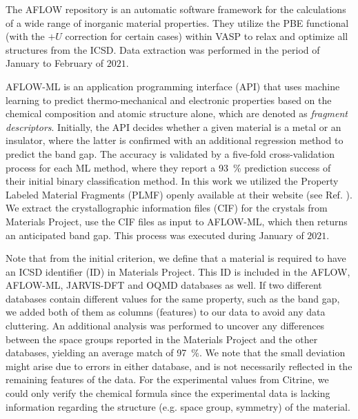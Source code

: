 \documentclass[superscriptaddress,
preprint,
 amsmath,amssymb,
 aps,
]{revtex4-2}
\begin{document}
The AFLOW \cite{Curtarolo2012, Curtarolo2012a, Calderon2015} repository is an automatic software framework for the calculations of a wide range of inorganic material properties. They utilize the PBE functional (with the $+U$ correction for certain cases) within VASP to relax and optimize all structures from the ICSD. Data extraction was performed in the period of January to February of $2021$.

AFLOW-ML \cite{Isayev2017} is an application programming interface (API) that uses machine learning to predict thermo-mechanical and electronic properties based on the chemical composition and atomic structure alone, which are denoted as \textit{fragment descriptors}. Initially, the API decides whether a given material is a metal or an insulator, where the latter is confirmed with an additional regression method to predict the band gap. The accuracy is validated by a five-fold cross-validation process for each ML method, where they report a \SI{93}{\percent} prediction success of their initial binary classification method. In this work we utilized the Property Labeled Material Fragments (PLMF) openly available at their website 
(see Ref. \cite{Isayev2017}). 
We extract the crystallographic information files (CIF) for the crystals from Materials Project, use the CIF files as input to AFLOW-ML, which then returns an anticipated band gap. This process was executed during January of $2021$. 

Note that from the initial criterion, we define that a material is required to have an ICSD identifier (ID) in Materials Project. This ID is included in the AFLOW,  AFLOW-ML, JARVIS-DFT and OQMD databases as well. If two different databases contain different values for the same property, such as the band gap, we added both of them as columns (features) to our data to avoid any data cluttering. An additional analysis was performed to uncover any differences between the space groups reported in the Materials Project and the other databases, yielding an average match of \SI{97}{\percent}. We note that the small deviation might arise due to errors in either database, and is not necessarily reflected in the remaining features of the data. For the experimental values from Citrine, we could only verify the chemical formula since the experimental data is lacking information regarding the structure (e.g. space group, symmetry) of the material.
\end{document}
